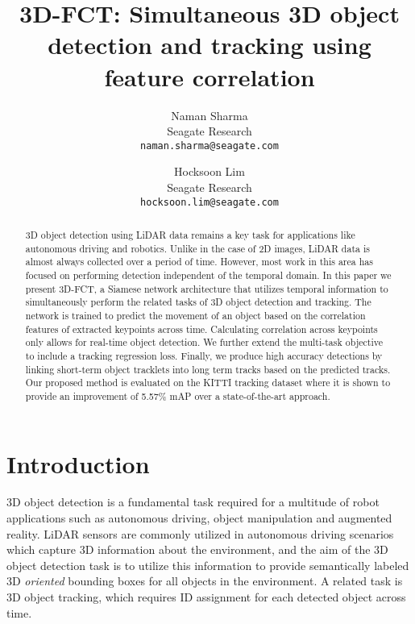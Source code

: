\documentclass[10pt,twocolumn,letterpaper]{article}
\begin{document}
\title{3D-FCT: Simultaneous 3D object detection and tracking using feature correlation}

\author{Naman Sharma\\
Seagate Research\\
{\tt\small naman.sharma@seagate.com}
\and
Hocksoon Lim\\
Seagate Research\\
{\tt\small hocksoon.lim@seagate.com}
}

\maketitle


\begin{abstract}
   3D object detection using LiDAR data remains a key task for applications like autonomous driving and robotics. Unlike in the case of 2D images, LiDAR data is almost always collected over a period of time. However, most work in this area has focused on performing detection independent of the temporal domain. In this paper we present 3D-FCT, a Siamese network architecture that utilizes temporal information to simultaneously perform the related tasks of 3D object detection and tracking. The network is trained to predict the movement of an object based on the correlation features of extracted keypoints across time. Calculating correlation across keypoints only allows for real-time object detection. We further extend the multi-task objective to include a tracking regression loss. Finally, we produce high accuracy detections by linking short-term object tracklets into long term tracks based on the predicted tracks. Our proposed method is evaluated on the KITTI tracking dataset where it is shown to provide an improvement of 5.57\% mAP over a state-of-the-art approach.
\end{abstract}

\section{Introduction}\label{sec:intro}
3D object detection is a fundamental task required for a multitude of robot applications such as autonomous driving, object manipulation and augmented reality. LiDAR sensors are commonly utilized in autonomous driving scenarios which capture 3D information about the environment, and the aim of the 3D object detection task is to utilize this information to provide semantically labeled 3D {\em oriented} bounding boxes for all objects in the environment. A related task is 3D object tracking, which requires ID assignment for each detected object across time.
\end{document}
